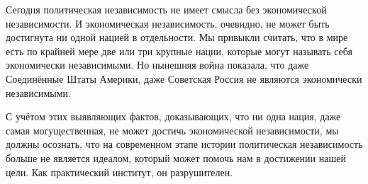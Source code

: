 Сегодня политическая независимость не имеет смысла без экономической независимости. И экономическая независимость, очевидно, не может быть достигнута ни одной нацией в отдельности. Мы привыкли считать, что в мире есть по крайней мере две или три крупные нации, которые могут называть себя экономически независимыми. Но нынешняя война показала, что даже Соединённые Штаты Америки, даже Советская Россия не являются экономически независимыми.

С учётом этих выявляющих фактов, доказывающих, что ни одна нация, даже самая могущественная, не может достичь экономической независимости, мы должны осознать, что на современном этапе истории политическая независимость больше не является идеалом, который может помочь нам в достижении нашей цели. Как практический институт, он разрушителен.
